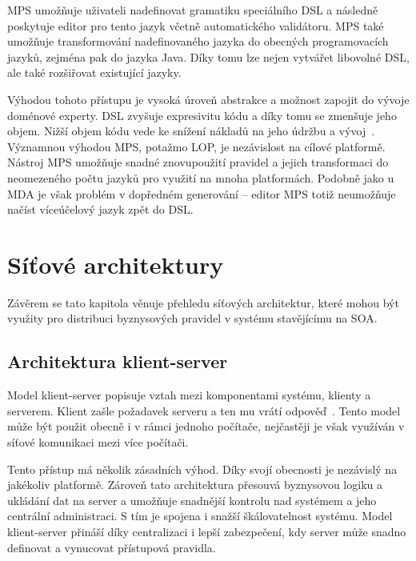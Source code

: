 MPS umožňuje uživateli nadefinovat gramatiku speciálního \gls{DSL} a následně poskytuje
editor pro tento jazyk včetně automatického validátoru. MPS také umožňuje transformování
nadefinovaného jazyka do obecných programovacích jazyků, zejména pak do jazyka Java.
Díky tomu lze nejen vytvářet libovolné \gls{DSL}, ale také rozšiřovat existující jazyky.

Výhodou tohoto přístupu je vysoká úroveň abstrakce a možnost zapojit do vývoje doménové experty.
\gls{DSL} zvyšuje expresivitu kódu a díky tomu se zmenšuje jeho objem.
Nižší objem kódu vede ke snížení nákladů na jeho údržbu a vývoj~\cite{littman1987mental, soloway1986empirical}.
Významnou výhodou MPS, potažmo \gls{LOP}, je nezávislost na cílové platformě.
Nástroj MPS umožňuje snadné znovupoužití pravidel a jejich transformaci do neomezeného počtu jazyků pro
využití na mnoha platformách. Podobně jako u \gls{MDA} je však problém v dopředném
generování -- editor MPS totiž neumožňuje načíst víceúčelový jazyk zpět do \gls{DSL}.

\section{Síťové architektury}

Závěrem se tato kapitola věnuje přehledu síťových architektur, které mohou být využity pro
distribuci byznysových pravidel v systému stavějícímu na \gls{SOA}.

\subsection{Architektura klient-server}\label{sec:client-server}

Model klient-server popisuje vztah mezi komponentami systému, klienty a serverem.
Klient zašle požadavek serveru a ten mu vrátí odpověď~\cite{berson1992client}.
Tento model může být použit obecně i v rámci jednoho počítače,
nejčastěji je však využíván v síťové komunikaci mezi více počítači.


Tento přístup má několik zásadních výhod. Díky svojí obecnosti je nezávislý
na jakékoliv platformě. Zároveň tato architektura přesouvá byznysovou logiku a
ukládání dat na server a umožňuje snadnější kontrolu nad systémem a jeho centrální
administraci. S tím je spojena i snažší škálovatelnost systému. Model klient-server
přináší díky centralizaci i lepší zabezpečení, kdy server může snadno definovat a
vynucovat přístupová pravidla.

